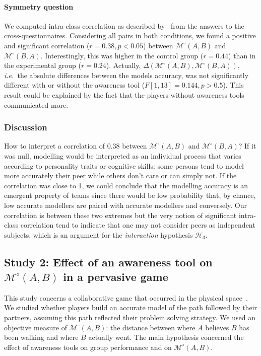 \documentclass[natbib]{svjour3}
\newcommand{\ie}{{\textit{i.e.\ }}}
\newcommand{\gModel}[2]{{$\mathcal{M}^{\circ}(#1, #2)$}}
\newcommand{\gMdeg}[2]{{\mathcal{M}^{\circ}(#1, #2)}}
\begin{document}
\paragraph{Symmetry question} We computed intra-class correlation as described
by~\citet{kenny1998data} from the answers to the cross-questionnaires.
Considering all pairs in both conditions, we found a positive and significant
correlation ($r = 0.38, p < 0.05$) between \gModel{A}{B} and \gModel{B}{A}.
Interestingly, this was higher in the control group ($r = 0.44$) than in the
experimental group ($r = 0.24$). Actually, $\Delta(\gMdeg{A}{B},\gMdeg{B}{A})$,
\ie the absolute differences between the models accuracy, was not significantly
different with or without the awareness tool ($F [1,13]= 0.144, p > 0.5$). This
result could be explained by the fact that the players without awareness tools
communicated more.

\subsubsection*{Discussion}

How to interpret a correlation of 0.38 between \gModel{A}{B} and \gModel{B}{A}?
If it was null, modelling would be interpreted as an individual process that
varies according to personality traits or cognitive skills: some persons tend to
model more accurately their peer while others don't care or can simply not. If
the correlation was close to 1, we could conclude that the modelling accuracy is
an emergent property of teams since there would be low probability that, by
chance, low accurate modellers are paired with accurate modellers and
conversely. Our correlation is between these two extremes but the very notion of
significant intra-class correlation tend to indicate that one may not consider
peers as independent subjects, which is an argument for the \emph{interaction}
hypothesis $\mathcal{H}_{3}$. 


\subsection{{\bf Study 2}: Effect of an awareness tool on \gModel{A}{B}  in a pervasive
game}

This study concerns a collaborative game that occurred in the physical
space~\citep{nova2006underwhelming}. We studied whether players build an accurate
model of the path followed by their partners, assuming this path reflected their
problem solving strategy. We used an objective measure of \gModel{A}{B}: the
distance between where $A$ believes $B$ has been walking and where $B$ actually went.
The main hypothesis concerned the effect of awareness tools on group performance
and on \gModel{A}{B}. 
\end{document}
